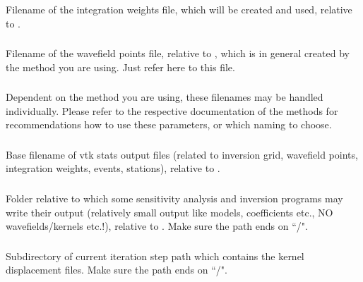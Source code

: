 \subsubsection{} 
Filename of the integration weights file, which will be created and used, relative to 
. 
\subsubsection{} 
Filename of the wavefield points file, relative to , which
is in general created by the method you are using. Just refer here to this file. 
\subsubsection{} \label{files,sec:iter_parfile,itm:model}
Dependent on the method you are using, these filenames may be handled individually. Please refer to the respective 
documentation of the methods for recommendations how to use these parameters, or which naming to choose.
\subsubsection{}
Base filename of vtk stats output files (related to inversion grid, wavefield points, integration weights,
events, stations), relative to . 
\subsubsection{}
Folder relative to which some sensitivity analysis and inversion programs may write their output (relatively small output
like models, coefficients etc., NO wavefields/kernels etc.!), relative to 
.  Make sure the path ends on ``/".
\subsubsection{} 
Subdirectory of current iteration step path
 which contains the 
kernel displacement files. Make sure the path ends on ``/".
